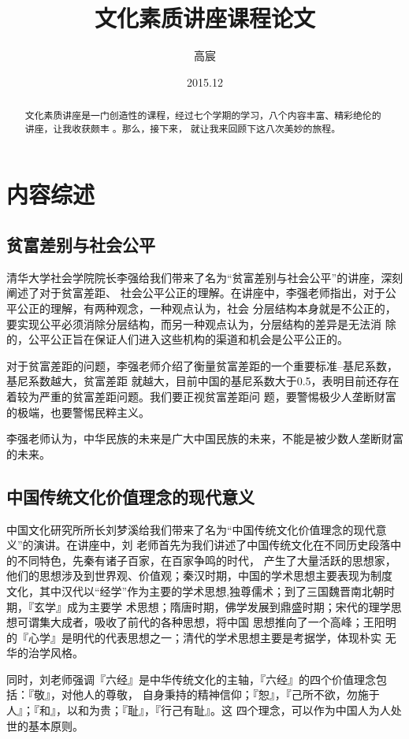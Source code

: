 \documentclass[a4paper]{cctart}
\title{文化素质讲座课程论文}
\author{高宸}
\date{2015.12}
\affil{电子工程系~无22班~2012011027}
\numberwithin{equation}{section} \pagestyle{fancy}
\begin{document}
\maketitle
\begin{abstract}
文化素质讲座是一门创造性的课程，经过七个学期的学习，八个内容丰富、精彩绝伦的讲座，让我收获颇丰
。那么，接下来，
就让我来回顾下这八次美妙的旅程。
\end{abstract}

\section{内容综述}\label{1}
\subsection{贫富差别与社会公平}
清华大学社会学院院长李强给我们带来了名为“贫富差别与社会公平”的讲座，深刻阐述了对于贫富差距、
社会公平公正的理解。在讲座中，李强老师指出，对于公平公正的理解，有两种观念，一种观点认为，社会
分层结构本身就是不公正的，要实现公平必须消除分层结构，而另一种观点认为，分层结构的差异是无法消
除的，公平公正旨在保证人们进入这些机构的渠道和机会是公平公正的。

对于贫富差距的问题，李强老师介绍了衡量贫富差距的一个重要标准--基尼系数，基尼系数越大，贫富差距
就越大，目前中国的基尼系数大于0.5，表明目前还存在着较为严重的贫富差距问题。我们要正视贫富差距问
题，要警惕极少人垄断财富的极端，也要警惕民粹主义。

李强老师认为，中华民族的未来是广大中国民族的未来，不能是被少数人垄断财富的未来。
\subsection{中国传统文化价值理念的现代意义}
中国文化研究所所长刘梦溪给我们带来了名为“中国传统文化价值理念的现代意义”的演讲。在讲座中，刘
老师首先为我们讲述了中国传统文化在不同历史段落中的不同特色，先秦有诸子百家，在百家争鸣的时代，
产生了大量活跃的思想家，他们的思想涉及到世界观、价值观；秦汉时期，中国的学术思想主要表现为制度
文化，其中汉代以“经学”作为主要的学术思想,独尊儒术；到了三国魏晋南北朝时期，『玄学』成为主要学
术思想；隋唐时期，佛学发展到鼎盛时期；宋代的理学思想可谓集大成者，吸收了前代的各种思想，将中国
思想推向了一个高峰；王阳明的『心学』是明代的代表思想之一；清代的学术思想主要是考据学，体现朴实
无华的治学风格。

同时，刘老师强调『六经』是中华传统文化的主轴，『六经』的四个价值理念包括：『敬』，对他人的尊敬，
自身秉持的精神信仰；『恕』，『己所不欲，勿施于人』；『和』，以和为贵；『耻』，『行己有耻』。这
四个理念，可以作为中国人为人处世的基本原则。
\end{document}
